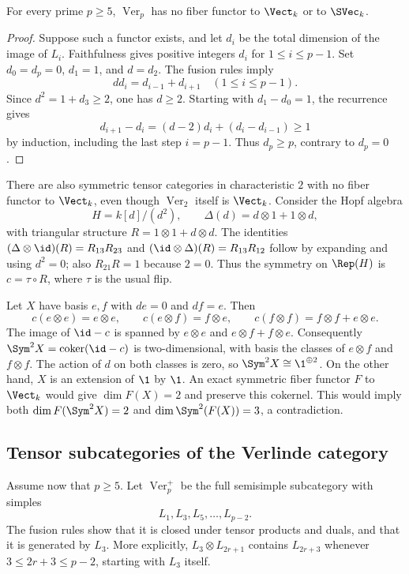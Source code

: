 \begin{proposition}
For every prime $p\geq5$, $\operatorname{Ver}_p$ has no fiber functor
to $\Vect_k$ or to $\SVec_k$.
\end{proposition}
\begin{proof}
Suppose such a functor exists, and let $d_i$ be the total dimension of
the image of $L_i$. Faithfulness gives positive integers $d_i$ for
$1\leq i\leq p-1$. Set $d_0=d_p=0$, $d_1=1$, and $d=d_2$.
The fusion rules imply
\[
 d d_i=d_{i-1}+d_{i+1}\quad(1\leq i\leq p-1).
\]
Since $d^2=1+d_3\geq2$, one has $d\geq2$. Starting with
$d_1-d_0=1$, the recurrence gives
\[
 d_{i+1}-d_i=(d-2)d_i+(d_i-d_{i-1})\geq1
\]
by induction, including the last step $i=p-1$. Thus $d_p\geq p$,
contrary to $d_p=0$.
\end{proof}

\begin{example}
There are also symmetric tensor categories in characteristic $2$ with
no fiber functor to $\Vect_k$, even though $\operatorname{Ver}_2$ itself
is $\Vect_k$. Consider the Hopf algebra
\[
 H=k[d]/(d^2),\qquad \Delta(d)=d\otimes1+1\otimes d,
\]
with triangular structure $R=1\otimes1+d\otimes d$. The identities
$(\Delta\otimes\id)(R)=R_{13}R_{23}$ and
$(\id\otimes\Delta)(R)=R_{13}R_{12}$ follow by expanding and using
$d^2=0$; also $R_{21}R=1$ because $2=0$. Thus the symmetry on
$\Rep(H)$ is $c=\tau\circ R$, where $\tau$ is the usual flip.

Let $X$ have basis $e,f$ with $de=0$ and $df=e$. Then
\[
 c(e\otimes e)=e\otimes e,\qquad
 c(e\otimes f)=f\otimes e,\qquad
 c(f\otimes f)=f\otimes f+e\otimes e.
\]
The image of $\id-c$ is spanned by $e\otimes e$ and
$e\otimes f+f\otimes e$. Consequently
$\Sym^2X=\operatorname{coker}(\id-c)$ is two-dimensional, with basis
the classes of $e\otimes f$ and $f\otimes f$. The action of $d$ on
both classes is zero, so $\Sym^2X\cong\1^{\oplus2}$.
On the other hand, $X$ is an extension of $\1$ by $\1$. An exact
symmetric fiber functor $F$ to $\Vect_k$ would give $\dim F(X)=2$
and preserve this cokernel. This would imply both
$\dim F(\Sym^2X)=2$ and
$\dim\Sym^2(F(X))=3$, a contradiction.
\end{example}

\subsection{Tensor subcategories of the Verlinde category}

Assume now that $p\geq5$. Let $\operatorname{Ver}_p^+$ be the full
semisimple subcategory with simples
\[
 L_1,L_3,L_5,\ldots,L_{p-2}.
\]
The fusion rules show that it is closed under tensor products and
duals, and that it is generated by $L_3$. More explicitly,
$L_3\otimes L_{2r+1}$ contains $L_{2r+3}$ whenever
$3\leq2r+3\leq p-2$, starting with $L_3$ itself.


